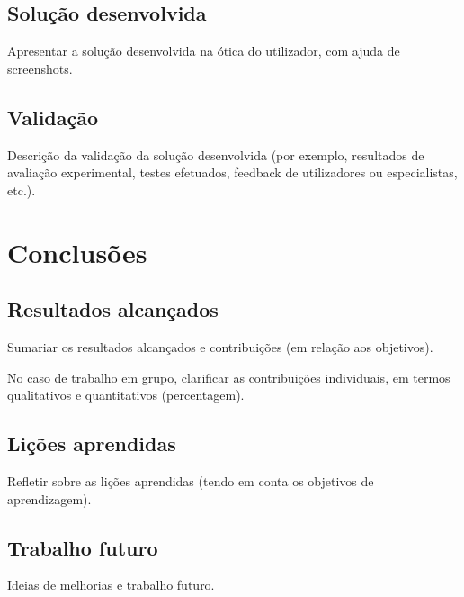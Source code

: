 \documentclass[10pt]{article}
\begin{document}
\subsection{Solução desenvolvida}

Apresentar a solução desenvolvida na ótica do utilizador, com ajuda de screenshots.

\subsection{Validação}

Descrição da validação da solução desenvolvida (por exemplo, resultados de avaliação experimental, testes efetuados, feedback de utilizadores ou especialistas, etc.).


\section{Conclusões}


	
\subsection{Resultados alcançados} 	
 Sumariar os resultados alcançados e contribuições (em relação aos objetivos).
	
 No caso de trabalho em grupo, clarificar as contribuições individuais, em termos qualitativos e quantitativos (percentagem).
\subsection{Lições aprendidas} 	
 Refletir sobre as lições aprendidas (tendo em conta os objetivos de aprendizagem).
	
\subsection{Trabalho futuro} 
 
 Ideias de melhorias e trabalho futuro. 
	


 
 
\end{document}
